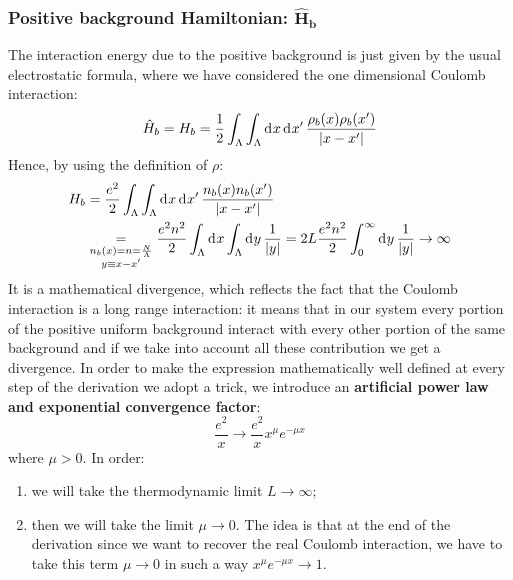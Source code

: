 \documentclass[11pt, a4paper, twoside, openright]{article}
\begin{document}
\subsubsection*{Positive background Hamiltonian: \( \mathbf{\hat{H}_b } \) }
The interaction energy due to the positive background is just given by the usual electrostatic formula, where we have considered the one dimensional Coulomb interaction:
\begin{equation*}
  \hat{H}_b = H_b = \frac{1}{2} \int_{\Lambda }^{} \int_{\Lambda }^{} \dd[]{x}  \dd[]{x'} \frac{\rho _b (x) \rho _b (x')}{\abs{x-x'} }
\end{equation*}
Hence, by using the definition of \( \rho  \):
\begin{equation*}
\begin{split}
  H_b &= \frac{e^2}{2} \int_{\Lambda }^{} \int_{\Lambda }^{} \dd[]{x}  \dd[]{x'}
  \frac{n_b (x) n_b (x')}{\abs{x-x'} } \\
  & \underset{\substack{n_b (x) = n = \frac{N}{\Lambda } \\ y \equiv x-x' } }{=}  \frac{e^2 n^2}{2}  \int_{\Lambda }^{} \dd[]{x}  \int_{\Lambda }^{}  \dd[]{y}  \frac{1}{\abs{y} }
  = 2 L \frac{e^2 n^2}{2} \int_{0}^{\infty } \dd[]{y} \frac{1}{\abs{y} } \rightarrow \infty
\end{split}
\end{equation*}
It is a mathematical divergence, which reflects the fact that the Coulomb interaction is a long range interaction: it means that in our system every portion of the positive uniform background interact with every other portion of the same background and if we take into account all these contribution we get a divergence.
In order to make the expression mathematically well defined at every step of the derivation we adopt a trick, we introduce an \textbf{artificial power law and exponential convergence factor}:
\begin{equation*}
  \frac{e^2}{x} \rightarrow \frac{e^2}{x} x^\mu e^{- \mu x}
\end{equation*}
where \( \mu > 0 \).
In order:
\begin{enumerate}
\item we will take the thermodynamic limit \( L \rightarrow \infty \);
\item then we will take the limit \( \mu \rightarrow  0\). The idea is that at the end of the derivation since we want to recover the real Coulomb interaction, we have to take this term \( \mu \rightarrow 0 \) in such a way \( x^\mu e^{- \mu x} \rightarrow 1 \).
\end{enumerate}
\end{document}
